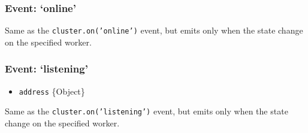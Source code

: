 \begin{Shaded}
\begin{Highlighting}[]
\NormalTok{\} } \NormalTok{\{}

  \NormalTok{(}
    \NormalTok{(}\NormalTok{);}
    \NormalTok{(}\NormalTok{);}

    \NormalTok{(\{ }\NormalTok{: } \NormalTok{\});}
  \NormalTok{(}\NormalTok{);}
\NormalTok{\}}
\end{Highlighting}
\end{Shaded}

\subsubsection{Event: `online'}

Same as the \texttt{cluster.on('online')} event, but emits only when the
state change on the specified worker.

\begin{Shaded}
\begin{Highlighting}[]
\NormalTok{(}\NormalTok{, }\NormalTok{() \{}
\NormalTok{\};}
\end{Highlighting}
\end{Shaded}

\subsubsection{Event: `listening'}

\begin{itemize}
\item
  \texttt{address} \{Object\}
\end{itemize}

Same as the \texttt{cluster.on('listening')} event, but emits only when
the state change on the specified worker.

\begin{Shaded}
\begin{Highlighting}[]
\NormalTok{(}\NormalTok{, }
\NormalTok{\};}
\end{Highlighting}
\end{Shaded}

